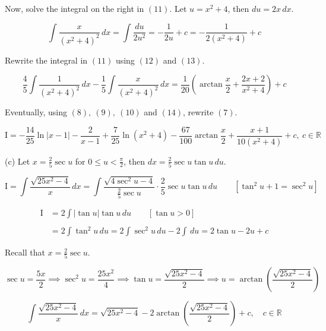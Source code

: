 \documentclass{article}
\begin{document}
\hfill

\noindent Now, solve the integral on the right in $(11)$. Let $u=x^2+4$, then $du=2x\,dx$.

\begin{equation}\int\frac x{\left(x^2+4\right)^2}\,dx=\int\frac{du}{2u^2}=-\frac1{2u}+c=-\frac1{2\left(x^2+4\right)}+c\end{equation}

\hfill

\noindent Rewrite the integral in $(11)$ using $(12)$ and $(13)$.

\begin{equation}\frac45\int\frac1{\left(x^2+4\right)^2}\,dx-\frac15\int\frac x{\left(x^2+4\right)^2}\,dx=\frac1{20}\left(\arctan\frac x2+\frac{2x+2}{x^2+4}\right)+c\end{equation}

\hfill

\noindent Eventually, using $(8),\:(9),\:(10)$ and $(14)$, rewrite $(7)$.

\[\mathrm{I}=\boxed{-\frac{14}{25}\ln\left|x-1\right|-\frac2{x-1}+\frac7{25}\ln\left(x^2+4\right)-\frac{67}{100}\arctan\frac x2+\frac{x+1}{10\left(x^2+4\right)}+c,\ c\in\mathbb{R}}\]

\hfill

\noindent (c) Let $\displaystyle x=\frac25\sec u$ for $\displaystyle 0\leq u<\frac\pi2$, then $dx=\displaystyle\frac25\sec u\tan u\,du$.

\[\mathrm{I}=\int\frac{\sqrt{25x^2-4}}{x}\,dx=\int\frac{\sqrt{4\sec^2u-4}}{\frac25\sec u}\cdot\frac25\sec u\tan u\,du\qquad\left[\tan^2u+1=\sec^2u\right]\]

\newpage

\begin{align*}\mathrm{I}&=2\int\left|\tan u\right|\tan u\,du\qquad\left[\tan u>0\right]\\\\&=2\int\tan^2u\,du=2\int\sec^2u\,du-2\int\,du=2\tan u-2u+c\end{align*}

\noindent Recall that $\displaystyle x=\frac25\sec u$.

\[\sec u=\frac{5x}2\implies\sec^2u=\frac{25x^2}4\implies\tan u=\frac{\sqrt{25x^2-4}}2\implies u=\arctan\left(\frac{\sqrt{25x^2-4}}2\right)\]

\[\int\frac{\sqrt{25x^2-4}}{x}\,dx=\boxed{\sqrt{25x^2-4}-2\arctan\left(\frac{\sqrt{25x^2-4}}2\right)+c,\quad c\in\mathbb{R}}\]

\hfill
\end{document}

